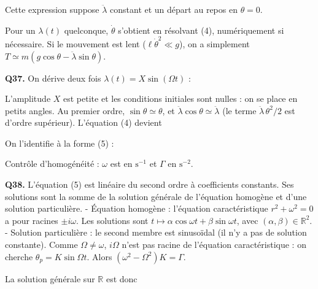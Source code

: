 \documentclass[11pt,a4paper]{article}
\newcommand{\equationajustee}[1]{%
  \sbox{\boiteequation}{$\displaystyle #1$}%
  \ifdim\wd\boiteequation>\linewidth
    \[\resizebox{\linewidth}{!}{\usebox{\boiteequation}}\]%
  \else
    \[#1\]%
  \fi}
\begin{document}
\equationajustee{\ell\dot\theta^2=2g(\cos\theta-1)-2\gamma\sin\theta .}

\equationajustee{\boxed{T=m\big[g\,(3\cos\theta-2)-3\,\ddot\lambda\sin\theta\big]}}

Cette expression suppose \(\ddot\lambda\) constant et un départ au repos en \(\theta=0\).

Pour un \(\lambda(t)\) quelconque, \(\dot\theta\) s'obtient en résolvant (4), numériquement si nécessaire. Si le mouvement est lent (\(\ell\dot\theta^2\ll g\)), on a simplement \(T\simeq m(g\cos\theta-\ddot\lambda\sin\theta)\).

\textbf{Q37.} On dérive deux fois \(\lambda(t)=X\sin(\Omega t)\) :

\equationajustee{\ddot\lambda(t)=-X\Omega^2\sin(\Omega t).}

L'amplitude \(X\) est petite et les conditions initiales sont nulles : on se place en petits angles. Au premier ordre, \(\sin\theta\simeq\theta\), et \(\ddot\lambda\cos\theta\simeq\ddot\lambda\) (le terme \(\ddot\lambda\,\theta^2/2\) est d'ordre supérieur). L'équation (4) devient

\equationajustee{\ddot\theta-\frac{X\Omega^2}{\ell}\sin(\Omega t)+\frac g\ell\,\theta=0 .}

On l'identifie à la forme (5) :

\equationajustee{\boxed{\begin{aligned}{}&\ddot\theta+\omega^2\theta=\Gamma\sin(\Omega t)\\
&\omega=\sqrt{\frac g\ell}\\
&\Gamma=\frac{X\Omega^2}{\ell}
\end{aligned}}}

Contrôle d'homogénéité : \(\omega\) est en \(\mathrm{s^{-1}}\) et \(\Gamma\) en \(\mathrm{s^{-2}}\).

\textbf{Q38.} L'équation (5) est linéaire du second ordre à coefficients constants. Ses solutions sont la somme de la solution générale de l'équation homogène et d'une solution particulière.
- Équation homogène : l'équation caractéristique \(r^2+\omega^2=0\) a pour racines \(\pm i\omega\). Les solutions sont \(t\mapsto\alpha\cos\omega t+\beta\sin\omega t\), avec \((\alpha,\beta)\in{\mathbb{R}}^2\).
- Solution particulière : le second membre est sinusoïdal (il n'y a pas de solution constante). Comme \(\Omega\neq\omega\), \(i\Omega\) n'est pas racine de l'équation caractéristique : on cherche \(\theta_p=K\sin\Omega t\). Alors \((\omega^2-\Omega^2)K=\Gamma\).

La solution générale sur \(\mathbb{R}\) est donc
\end{document}
